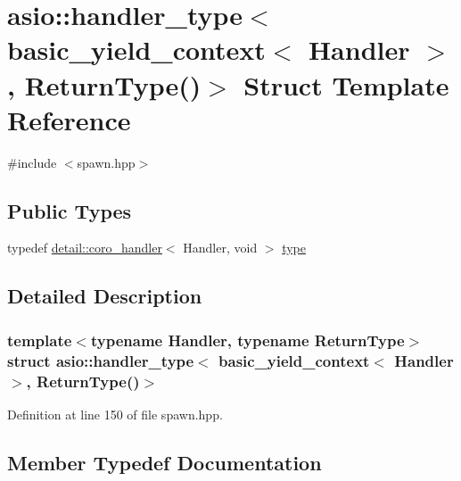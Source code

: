 \hypertarget{structasio_1_1handler__type_3_01basic__yield__context_3_01_handler_01_4_00_01_return_type_07_08_4}{}\section{asio\+:\+:handler\+\_\+type$<$ basic\+\_\+yield\+\_\+context$<$ Handler $>$, Return\+Type()$>$ Struct Template Reference}
\label{structasio_1_1handler__type_3_01basic__yield__context_3_01_handler_01_4_00_01_return_type_07_08_4}


{\ttfamily \#include $<$spawn.\+hpp$>$}

\subsection*{Public Types}
\begin{DoxyCompactItemize}
\item 
typedef \hyperlink{classasio_1_1detail_1_1coro__handler}{detail\+::coro\+\_\+handler}$<$ Handler, void $>$ \hyperlink{structasio_1_1handler__type_3_01basic__yield__context_3_01_handler_01_4_00_01_return_type_07_08_4_a95cc39df11262f252961b7f1a4e1586a}{type}
\end{DoxyCompactItemize}


\subsection{Detailed Description}
\subsubsection*{template$<$typename Handler, typename Return\+Type$>$struct asio\+::handler\+\_\+type$<$ basic\+\_\+yield\+\_\+context$<$ Handler $>$, Return\+Type()$>$}



Definition at line 150 of file spawn.\+hpp.



\subsection{Member Typedef Documentation}
\hypertarget{structasio_1_1handler__type_3_01basic__yield__context_3_01_handler_01_4_00_01_return_type_07_08_4_a95cc39df11262f252961b7f1a4e1586a}{}
